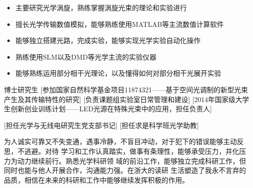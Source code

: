 \documentclass[zh]{resume}
\begin{document}
\begin{itemize}
  \item 主要研究光学涡旋，熟练掌握涡旋光束的理论和实验进行
  \item 擅长光学传输数值模拟，能够熟练使用MATLAB等主流数值计算软件
  \item 能够独立搭建光路，完成实验，能够实现光学实验自动化操作
  \item 熟练使用SLM以及DMD等光学主流的实验仪器
  \item 能够熟练运用部分相干光理论，以及懂得如何对部分相干光展开实验
\end{itemize}


\begin{experiences}
    {博士研究生}%
    [参加国家自然科学基金项目11874321——基于空间光调制的新型光束产生及其传输特性的研究] 
  [负责课题组实验室日常管理和建设]
  [2014年国家级大学生创新创业训练计划——LED光源在特殊光束中的应用，担任负责人]
\end{experiences}
\begin{experiences}
  [担任光学与无线电研究生党支部书记]
  [担任求是科学班光学助教]
\end{experiences}

\begin{competences}
\end{competences}

为人诚实可靠又不失变通，遇事冷静，不盲目冲动，对于犯下的错误能够主动反思，不逃避。对待
学习和工作认真踏实，做事有条理性，能够承受压力，并化压力为动力继续前行。熟悉光学科研领
域的前沿工作，能够独立完成科研工作，但同时也能与他人开展合作，沟通能力强。在浙大的读研
生活塑造了我永不言弃的品质，相信在未来的科研和工作中能够继续发挥积极的作用。
\end{document}
